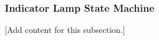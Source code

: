 
\subsubsection{Indicator Lamp State Machine}
\label{subsubsec:design_4_3_indicator_lamp_state_machine}

[Add content for this subsection.]
